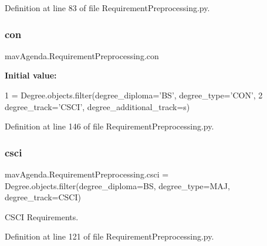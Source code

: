 Definition at line 83 of file Requirement\+Preprocessing.\+py.

\mbox{\label{namespacemavAgenda_1_1RequirementPreprocessing_ad63f688072e5be75854ab9d4371ce7b2}} 
\subsubsection{\texorpdfstring{con}{con}}
{\footnotesize\ttfamily mav\+Agenda.\+Requirement\+Preprocessing.\+con}

{\bfseries Initial value\+:}
\begin{DoxyCode}
1 =  Degree.objects.filter(degree\_diploma=\textcolor{stringliteral}{'BS'}, degree\_type=\textcolor{stringliteral}{'CON'},
2                                 degree\_track=\textcolor{stringliteral}{'CSCI'}, degree\_additional\_track=s)
\end{DoxyCode}


Definition at line 146 of file Requirement\+Preprocessing.\+py.

\mbox{\label{namespacemavAgenda_1_1RequirementPreprocessing_a1981c721791f4f2441162665525dffc1}} 
\subsubsection{\texorpdfstring{csci}{csci}}
{\footnotesize\ttfamily mav\+Agenda.\+Requirement\+Preprocessing.\+csci = Degree.\+objects.\+filter(degree\+\_\+diploma=\textquotesingle{}BS\textquotesingle{}, degree\+\_\+type=\textquotesingle{}M\+AJ\textquotesingle{}, degree\+\_\+track=\textquotesingle{}C\+S\+CI\textquotesingle{})}



C\+S\+CI Requirements. 



Definition at line 121 of file Requirement\+Preprocessing.\+py.

\mbox{\label{namespacemavAgenda_1_1RequirementPreprocessing_ad7cf7d47ad0cfa6bc49f64afeac2513b}} 
